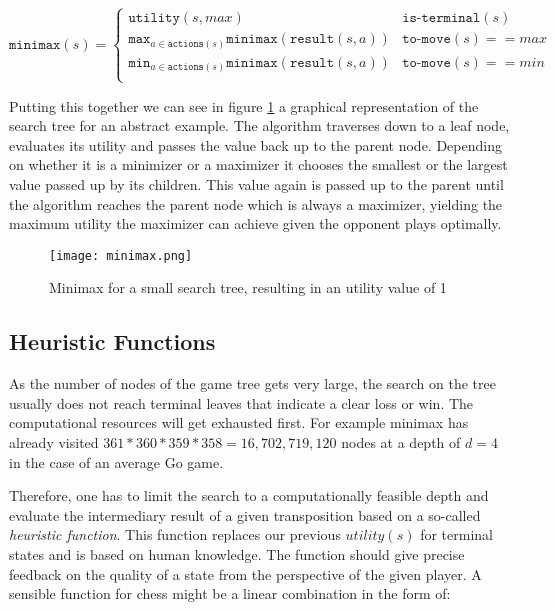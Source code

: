 \begin{equation}
    \texttt{minimax}(s) =
    \begin{cases}
        \texttt{utility}(s, max)                                                      & \texttt{is-terminal}(s)    \\
        \texttt{max}_{a\in\texttt{actions}(s)}\texttt{minimax}(\texttt{result}(s, a)) & \texttt{to-move}(s) == max \\
        \texttt{min}_{a\in\texttt{actions}(s)}\texttt{minimax}(\texttt{result}(s, a)) & \texttt{to-move}(s) == min \\
    \end{cases}
\end{equation}

Putting this together we can see in figure \ref{minimax} a graphical representation of the search tree for an abstract example. The algorithm traverses down to a leaf node, evaluates its utility and passes the value back up to the parent node. Depending on whether it is a minimizer or a maximizer it chooses the smallest or the largest value passed up by its children. This value again is passed up to the parent until the algorithm reaches the parent node which is always a maximizer, yielding the maximum utility the maximizer can achieve given the opponent plays optimally.

\begin{figure}
    \centering
    \texttt{[image: minimax.png]}
    \caption{Minimax for a small search tree, resulting in an utility value of 1}
    \label{minimax}
\end{figure}

\subsection{Heuristic Functions}
As the number of nodes of the game tree gets very large, the search on the tree usually does not reach terminal leaves that indicate a clear loss or win. The computational resources will get exhausted first. For example minimax has already visited $ 361 * 360 * 359 * 358 = 16,702,719,120 $ nodes at a depth of $ d = 4 $ in the case of an average Go game.

Therefore, one has to limit the search to a computationally feasible depth and evaluate the intermediary result of a given transposition based on a so-called \textit{heuristic function}. This function replaces our previous $ utility(s) $ for terminal states and is based on human knowledge. The function should give precise feedback on the quality of a state from the perspective of the given player. A sensible function for chess might be a linear combination in the form of:

